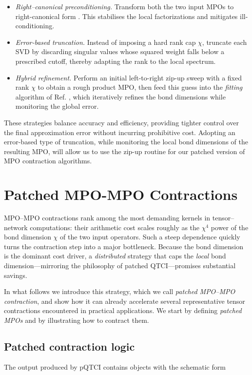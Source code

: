 \begin{itemize}
  \item \emph{Right–canonical preconditioning.}  
        Transform both the two input MPOs to right-canonical form
        \cite{vonDelftTNNotes}.  This stabilises the local factorizations and mitigates ill-conditioning.
  \item \emph{Error-based truncation.}  
        Instead of imposing a hard rank cap $\chi$, truncate each SVD by discarding singular values whose squared weight falls below a prescribed cutoff, thereby adapting the rank to the local spectrum.
  \item \emph{Hybrid refinement.}  
        Perform an initial left-to-right zip-up sweep with a fixed rank $\chi$ to obtain a rough product MPO, then feed this guess into the \emph{fitting} algorithm of Ref. \cite{Stoudenmire2010}, which iteratively refines the bond dimensions while monitoring the global error.
\end{itemize}

These strategies balance accuracy and efficiency, providing tighter control over the final approximation error without incurring prohibitive cost. Adopting an error-based type of truncation, while monitoring the local bond dimensions of the resulting MPO, will allow us to use the zip-up routine for our patched version of MPO contraction algorithms.

\section{Patched MPO-MPO Contractions}
\label{sec:PatchMPOMPOContr}

MPO–MPO contractions rank among the most demanding kernels in tensor–network computations: their arithmetic cost scales roughly as the \(\chi^{4}\) power of the bond dimension \(\chi\) of the two input operators.  Such a steep dependence quickly turns the contraction step into a major bottleneck.  
Because the bond dimension is the dominant cost driver, a \emph{distributed} strategy that caps the \emph{local} bond dimension—mirroring the philosophy of patched QTCI—promises substantial savings.

In what follows we introduce this strategy, which we call
\emph{patched MPO–MPO contraction}, and show how it can already accelerate several representative tensor contractions encountered in practical applications. We start by defining \textit{patched MPOs} and by illustrating how to contract them.

\subsection{Patched contraction logic}
The output produced by pQTCI contains objects with the schematic form


